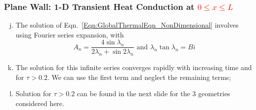\documentclass[10pt,compress]{beamer}
\newcommand{\frc}{\displaystyle\frac}
\newcommand{\red}{\textcolor{red}}
\begin{document}
\begin{frame}
 \frametitle{Plane Wall: 1-D Transient Heat Conduction at \red{$0\leq x\leq L$} }
   \begin{enumerate}[(a)]\setcounter{enumi}{9}%
     \item<1-> The solution of Eqn.~\ref{Eqn:GlobalThermalEqn_NonDimensional} involves using Fourier series expansion,
          with
          \begin{displaymath}
            A_{n} = \frc{4\sin{\lambda_{n}}}{2\lambda_{n}+\sin{2\lambda_{n}}}\text{ and } \lambda_{n}\tan{\lambda_{n}} = Bi
          \end{displaymath}
     \item<2-> The solution for this infinite series converges rapidly with increasing time and for $\tau > 0.2$. We can use the first term and neglect the remaining terms; 
     \item<3-> Solution for $\tau>0.2$ can be found in the next slide for the 3 geometries considered here.

   \end{enumerate} 
\end{frame}
\end{document}
